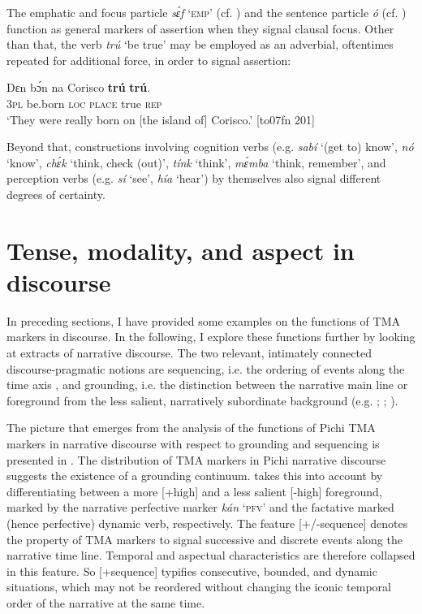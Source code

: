 The emphatic and focus particle \textit{sɛ́f} ‘\textsc{emp}’ (cf. ) and the sentence particle{\fff} \textit{ó} (cf. ) function as general markers of assertion when they signal clausal focus. Other than that, the verb \textit{trú} ‘be true’ may be employed as an adverbial, oftentimes repeated for additional force, in order to signal assertion:


\ea%
    \label{ex:key:455}
    \gll Dɛn  bɔ́n    na  Corisco  \textbf{trú} \textbf{trú}.\\
\textsc{3pl}  be.born  \textsc{loc}  \textsc{place}  true  \textsc{rep}\\

\glt ‘They were really born on [the island of] Corisco.’ [to07fn 201]
\z

Beyond that, constructions involving cognition verbs (e.g. \textit{sabí} ‘(get to) know’, \textit{nó} ‘know’, \textit{chɛ́k} ‘think, check (out)’, \textit{tínk} ‘think’, \textit{mɛ́mba} ‘think, remember’, and perception verbs (e.g. \textit{sí} ‘see’, \textit{hía} ‘hear’) by themselves also signal different degrees of certainty.{\fff} 

\section{Tense, modality, and aspect in discourse}\label{sec:6.8}

In preceding sections, I have provided some examples on the functions of TMA markers in discourse. In the following, I explore these functions further by looking at extracts of narrative discourse. The two relevant, intimately connected discourse-pragmatic notions are sequencing, i.e. the ordering of events along the time axis \citep{Hopper1982}, and grounding, i.e. the distinction between the narrative main line or foreground from the less salient, narratively subordinate background (e.g. \citealt{HopperThompson1980}; \citealt{Longacre1996}; \citealt{YoussefJames1999}).


The picture that emerges from the analysis of the functions of Pichi TMA markers in narrative discourse with respect to grounding and sequencing is presented in . The distribution of TMA markers in Pichi narrative discourse suggests the existence of a grounding continuum.  takes this into account by differentiating between a more [+high] and a less salient [-high] foreground, marked by the narrative perfective marker \textit{kán} ‘\textsc{pfv}’ and the factative marked (hence perfective) dynamic verb, respectively. The feature [+/-sequence] denotes the property of TMA markers to signal successive and discrete events along the narrative time line. Temporal and aspectual characteristics are therefore collapsed in this feature. So [+sequence] typifies consecutive, bounded, and dynamic situations, which may not be reordered without changing the iconic temporal order of the narrative at the same time. 



